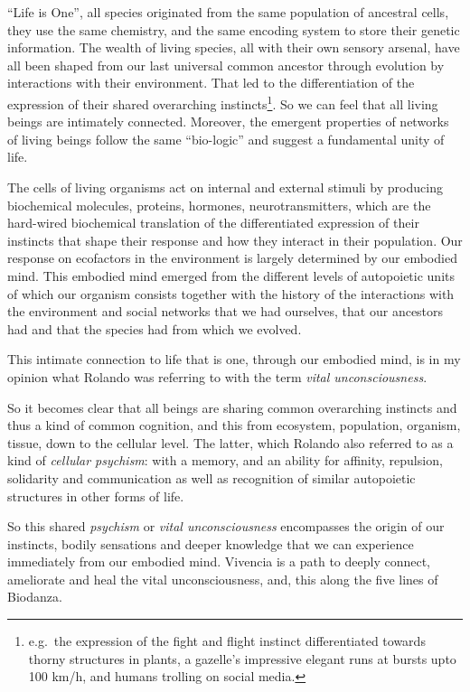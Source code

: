 \documentclass[
  11pt,
]{book}
\begin{document}
``Life is One'', all species originated from the same population of ancestral cells, they use the same chemistry, and the same encoding system to store their genetic information.
The wealth of living species, all with their own sensory arsenal, have all been shaped from our last universal common ancestor through evolution by interactions with their environment.
That led to the differentiation of the expression of their shared overarching instincts\footnote{e.g.~the expression of the fight and flight instinct differentiated towards thorny structures in plants, a gazelle's impressive elegant runs at bursts upto 100 km/h, and humans trolling on social media.}. So we can feel that all living beings are intimately connected. Moreover, the emergent properties of networks of living beings follow the same ``bio-logic'' and suggest a fundamental unity of life.

The cells of living organisms act on internal and external stimuli by producing biochemical molecules, proteins, hormones, neurotransmitters, which are the hard-wired biochemical translation of the differentiated expression of their instincts that shape their response and how they interact in their population.
Our response on ecofactors in the environment is largely determined by our embodied mind. This embodied mind emerged from the different levels of autopoietic units of which our organism consists together with the history of the interactions with the environment and social networks that we had ourselves, that our ancestors had and that the species had from which we evolved.

This intimate connection to life that is one, through our embodied mind, is in my opinion what Rolando was referring to with the term \emph{vital unconsciousness}.

So it becomes clear that all beings are sharing common overarching instincts and thus a kind of common cognition, and this from ecosystem, population, organism, tissue, down to the cellular level. The latter, which Rolando also referred to as a kind of \emph{cellular psychism}: with a memory, and an ability for affinity, repulsion, solidarity and communication as well as recognition of similar autopoietic structures in other forms of life.

So this shared \emph{psychism} or \emph{vital unconsciousness} encompasses the origin of our instincts, bodily sensations and deeper knowledge that we can experience immediately from our embodied mind. Vivencia is a path to deeply connect, ameliorate and heal the vital unconsciousness, and, this along the five lines of Biodanza.
\end{document}
